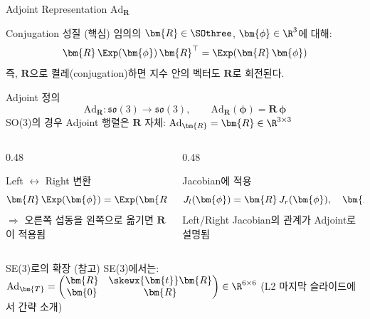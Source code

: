 \begin{frame}[shrink=20]{Adjoint Representation $\mathrm{Ad}_{\bm{R}}$}
  \begin{block}{Conjugation 성질 (핵심)}
    임의의 $\bm{R} \in \SOthree$, $\bm{\phi} \in \R^3$에 대해:
    \[
      \bm{R}\,\Exp(\bm{\phi})\,\bm{R}^\top = \Exp(\bm{R}\,\bm{\phi})
    \]
    즉, $\bm{R}$으로 켤레(conjugation)하면 지수 안의 벡터도 $\bm{R}$로 회전된다.
  \end{block}
  \pause
  \begin{alertblock}{Adjoint 정의}
    \[
      \mathrm{Ad}_{\bm{R}} : \mathfrak{so}(3) \to \mathfrak{so}(3), \qquad
      \mathrm{Ad}_{\bm{R}}(\bm{\phi}) = \bm{R}\,\bm{\phi}
    \]
    SO(3)의 경우 Adjoint 행렬은 $\bm{R}$ 자체: $\mathrm{Ad}_{\bm{R}} = \bm{R} \in \R^{3\times 3}$
  \end{alertblock}
  \pause
  \begin{columns}[T]
    \begin{column}{0.48\textwidth}
      \begin{block}{Left $\leftrightarrow$ Right 변환}
        \[
          \bm{R}\,\Exp(\bm{\phi}) = \Exp(\bm{R}\bm{\phi})\,\bm{R}
        \]
        $\Rightarrow$ 오른쪽 섭동을 왼쪽으로 옮기면 $\bm{R}$이 적용됨
      \end{block}
    \end{column}
    \begin{column}{0.48\textwidth}
      \begin{block}{Jacobian에 적용}
        \[
          J_l(\bm{\phi}) = \bm{R}\,J_r(\bm{\phi}), \quad \bm{R}=\Exp(\bm{\phi})
        \]
        Left/Right Jacobian의 관계가 Adjoint로 설명됨
      \end{block}
    \end{column}
  \end{columns}
  \vspace{0.4em}
  \begin{exampleblock}{SE(3)로의 확장 (참고)}
    SE(3)에서는: $\mathrm{Ad}_{\bm{T}} = \begin{pmatrix} \bm{R} & \skewx{\bm{t}}\bm{R} \\ \bm{0} & \bm{R} \end{pmatrix} \in \R^{6\times 6}$
    (L2 마지막 슬라이드에서 간략 소개)
  \end{exampleblock}
\end{frame}


